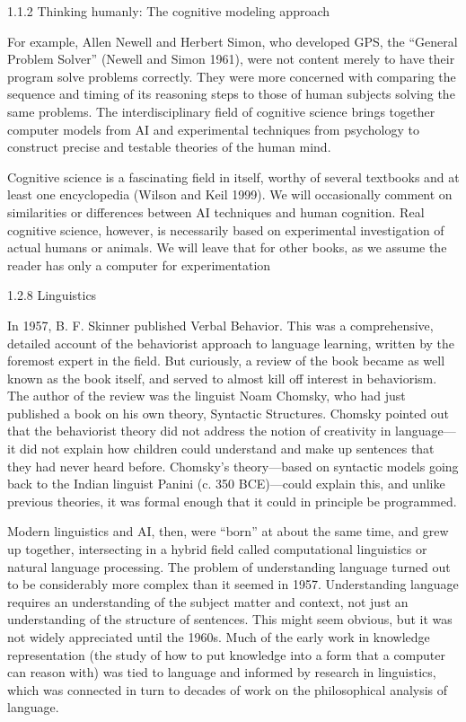 1.1.2 Thinking humanly: The cognitive modeling approach

For example, Allen Newell and Herbert Simon, who developed GPS, the “General Problem Solver” (Newell and Simon 1961), were not content merely to have their program solve problems correctly. They were more concerned with comparing the sequence and timing of its reasoning steps to those of human subjects solving the same problems. The interdisciplinary field of cognitive science brings together computer models from AI and experimental techniques from psychology to construct precise and testable theories of the human mind.

Cognitive science is a fascinating field in itself, worthy of several textbooks and at least one encyclopedia (Wilson and Keil 1999). We will occasionally comment on similarities or differences between AI techniques and human cognition. Real cognitive science, however, is necessarily based on experimental investigation of actual humans or animals. We will leave that for other books, as we assume the reader has only a computer for experimentation

1.2.8 Linguistics

In 1957, B. F. Skinner published Verbal Behavior. This was a comprehensive, detailed account of the behaviorist approach to language learning, written by the foremost expert in the field. But curiously, a review of the book became as well known as the book itself, and served to almost kill off interest in behaviorism. The author of the review was the linguist Noam Chomsky, who had just published a book on his own theory, Syntactic Structures. Chomsky pointed out that the behaviorist theory did not address the notion of creativity in language—it did not explain how children could understand and make up sentences that they had never heard before. Chomsky’s theory—based on syntactic models going back to the Indian linguist Panini (c. 350 BCE)—could explain this, and unlike previous theories, it was formal enough that it could in principle be programmed.

Modern linguistics and AI, then, were “born” at about the same time, and grew up together, intersecting in a hybrid field called computational linguistics or natural language processing. The problem of understanding language turned out to be considerably more complex than it seemed in 1957. Understanding language requires an understanding of the subject matter and context, not just an understanding of the structure of sentences. This might seem obvious, but it was not widely appreciated until the 1960s. Much of the early work in knowledge representation (the study of how to put knowledge into a form that a computer can reason with) was tied to language and informed by research in linguistics, which was connected in turn to decades of work on the philosophical analysis of language.


